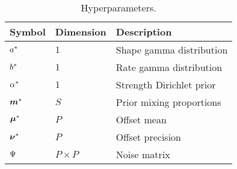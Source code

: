 \documentclass[a4paper]{article}
\begin{document}
\begin{table}[h]
  \begin{center}
  \begin{tabular}{lll}
    \toprule
    Symbol & Dimension & Description \\ \hline
    $a^*$ & $1$ & Shape gamma distribution \\
    $b^*$ & $1$ & Rate gamma distribution \\
    $\alpha^*$ & $1$ & Strength Dirichlet prior \\
    $\boldsymbol{m}^*$ & $S$ & Prior mixing proportions \\
    $\boldsymbol{\mu}^*$ & $P$ & Offset mean \\
    $\boldsymbol{\nu}^*$ & $P$ & Offset precision \\
    $\Psi$ & $P \times P$ & Noise matrix \\
    \bottomrule
  \end{tabular}
  \caption{Hyperparameters.}
\end{center}
\end{table}
\end{document}
